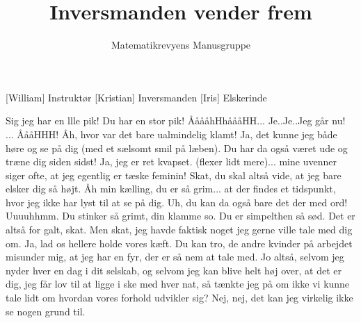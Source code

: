 \documentclass[a4paper,11pt]{article}
\title{Inversmanden vender frem}
\author{Matematikrevyens Manusgruppe}
\begin{document}
\maketitle

\begin{roles}
[William] Instruktør
[Kristian] Inversmanden
[Iris] Elskerinde
\end{roles}

\begin{props}
\end{props}

  
\begin{sketch}
 Sig jeg har en llle pik!
 Du har en stor pik!
 ÅåååhHhåååHH... Je..Je..Jeg går nu! ...  ÅååHHH!
 Åh, hvor var det bare ualmindelig klamt!
 Ja, det kunne jeg både høre og se på dig (med et sælsomt smil på læben). Du har da også været ude og træne dig siden sidst!
 Ja, jeg er ret kvapset. (flexer lidt mere)... mine uvenner siger ofte, at jeg egentlig er tæske feminin!
 Skat, du skal altså vide, at jeg bare elsker dig så højt.
 Åh min kælling, du er så grim... at der findes et tidspunkt, hvor jeg ikke har lyst til at se på dig.
 Uh, du kan da også bare det der med ord!
 Uuuuhhmm. Du stinker så grimt, din klamme so.
 Du er simpelthen så sød. Det er altså for galt, skat. Men skat, jeg havde faktisk noget jeg gerne ville tale med dig om.
 Ja, lad os hellere holde vores kæft.
 Du kan tro, de andre kvinder på arbejdet misunder mig, at jeg har en fyr, der er så nem at tale med. Jo altså, selvom jeg nyder hver en dag i dit selskab, og selvom jeg kan blive helt høj over, at det er dig, jeg får lov til at ligge i ske med hver nat, så tænkte jeg på om ikke vi kunne tale lidt om hvordan vores forhold udvikler sig?
  Nej, nej, det kan jeg virkelig ikke se nogen grund til.

\end{sketch}
\end{document}
